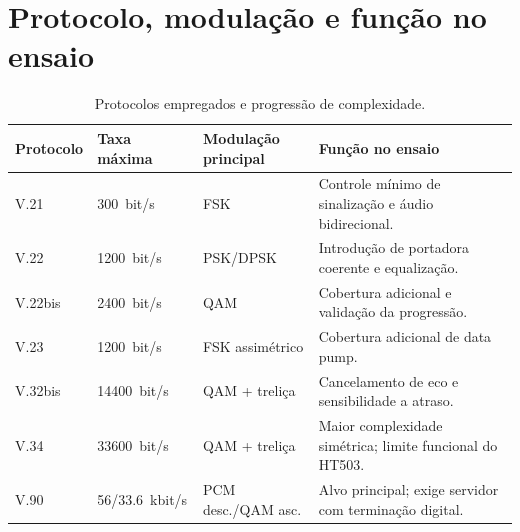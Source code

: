\documentclass[12pt,a4paper]{article}
\begin{document}
\section{Protocolo, modulação e função no ensaio}

\begin{table}[H]
\centering
\caption{Protocolos empregados e progressão de complexidade.}
\begin{tabularx}{\textwidth}{lC{3cm}C{3.2cm}Y}
\toprule
\textbf{Protocolo} & \textbf{Taxa máxima} & \textbf{Modulação principal} & \textbf{Função no ensaio} \\
\midrule
V.21 & \SI{300}{bit/s} & FSK & Controle mínimo de sinalização e áudio bidirecional. \\
V.22 & \SI{1200}{bit/s} & PSK/DPSK & Introdução de portadora coerente e equalização. \\
V.22bis & \SI{2400}{bit/s} & QAM & Cobertura adicional e validação da progressão. \\
V.23 & \SI{1200}{bit/s} & FSK assimétrico & Cobertura adicional de data pump. \\
V.32bis & \SI{14400}{bit/s} & QAM + treliça & Cancelamento de eco e sensibilidade a atraso. \\
V.34 & \SI{33600}{bit/s} & QAM + treliça & Maior complexidade simétrica; limite funcional do HT503. \\
V.90 & 56/\SI{33.6}{kbit/s} & PCM desc./QAM asc. & Alvo principal; exige servidor com terminação digital. \\
\bottomrule
\end{tabularx}
\end{table}

\clearpage
{}
{}

\end{document}
